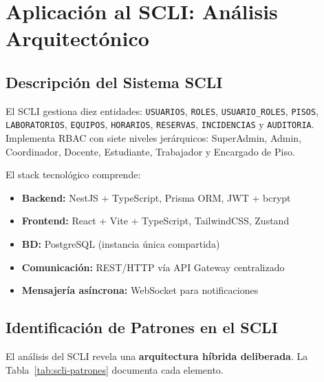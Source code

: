 \documentclass[conference,a4paper]{IEEEtran}
\begin{document}
\section{Aplicaci\'on al SCLI: An\'alisis Arquitect\'onico}
\label{sec:scli}

\subsection{Descripci\'on del Sistema SCLI}

El SCLI gestiona diez entidades: \texttt{USUARIOS}, \texttt{ROLES},
\texttt{USUARIO\_ROLES}, \texttt{PISOS}, \texttt{LABORATORIOS},
\texttt{EQUIPOS}, \texttt{HORARIOS}, \texttt{RESERVAS},
\texttt{INCIDENCIAS} y \texttt{AUDITORIA}. Implementa RBAC con
siete niveles jer\'arquicos: SuperAdmin, Admin, Coordinador,
Docente, Estudiante, Trabajador y Encargado de Piso.

El stack tecnol\'ogico comprende:
\begin{itemize}[leftmargin=*]
  \item \textbf{Backend:} NestJS + TypeScript, Prisma ORM, JWT + bcrypt
  \item \textbf{Frontend:} React + Vite + TypeScript, TailwindCSS, Zustand
  \item \textbf{BD:} PostgreSQL (instancia \'unica compartida)
  \item \textbf{Comunicaci\'on:} REST/HTTP v\'ia API Gateway centralizado
  \item \textbf{Mensajer\'ia as\'incrona:} WebSocket para notificaciones
\end{itemize}

\subsection{Identificaci\'on de Patrones en el SCLI}

El an\'alisis del SCLI revela una \textbf{arquitectura h\'ibrida
deliberada}. La Tabla~\ref{tab:scli-patrones} documenta cada elemento.
\end{document}
